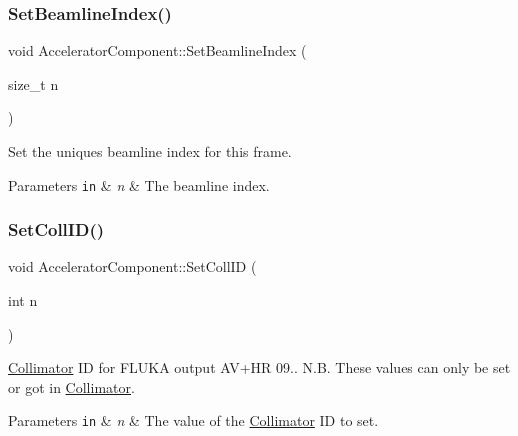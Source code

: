 \subsubsection{\texorpdfstring{Set\+Beamline\+Index()}{SetBeamlineIndex()}}
{\footnotesize\ttfamily void Accelerator\+Component\+::\+Set\+Beamline\+Index (\begin{DoxyParamCaption}\item[{size\+\_\+t}]{n }\end{DoxyParamCaption})\hspace{0.3cm}{\ttfamily [inline]}}

Set the uniques beamline index for this frame. 
\begin{DoxyParams}[1]{Parameters}
\mbox{\tt in}  & {\em n} & The beamline index. \\
\hline
\end{DoxyParams}
\mbox{\label{classAcceleratorComponent_a83dc19ee2dae64632cc770e6937828bc}} 
\subsubsection{\texorpdfstring{Set\+Coll\+I\+D()}{SetCollID()}}
{\footnotesize\ttfamily void Accelerator\+Component\+::\+Set\+Coll\+ID (\begin{DoxyParamCaption}\item[{int}]{n }\end{DoxyParamCaption})\hspace{0.3cm}{\ttfamily [inline]}}

\hyperlink{classCollimator}{Collimator} ID for F\+L\+U\+KA output A\+V+\+HR 09.. N.\+B. These values can only be set or got in \hyperlink{classCollimator}{Collimator}. 
\begin{DoxyParams}[1]{Parameters}
\mbox{\tt in}  & {\em n} & The value of the \hyperlink{classCollimator}{Collimator} ID to set. \\
\hline
\end{DoxyParams}
\mbox{\label{classAcceleratorComponent_afab772327a61defbc42a91254b79457c}} 
